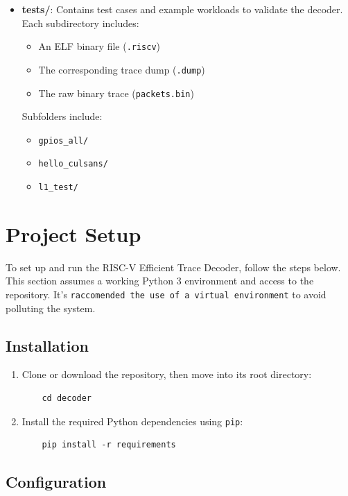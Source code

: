 \documentclass[a4paper,12pt]{article}
\begin{document}
\begin{itemize}
    \item \textbf{tests/}: Contains test cases and example workloads to validate the decoder. Each subdirectory includes:
    \begin{itemize}
        \item An ELF binary file (\texttt{.riscv})
        \item The corresponding trace dump (\texttt{.dump})
        \item The raw binary trace (\texttt{packets.bin})
    \end{itemize}
    Subfolders include:
    \begin{itemize}
        \item \texttt{gpios\_all/}
        \item \texttt{hello\_culsans/}
        \item \texttt{l1\_test/}
    \end{itemize}
\end{itemize}




\section{Project Setup}

To set up and run the RISC-V Efficient Trace Decoder, follow the steps below. This section assumes a working Python 3 environment and access to the repository. It's \texttt{raccomended the use of a virtual environment} to avoid polluting the system.

\subsection{Installation}

\begin{enumerate}
    \item Clone or download the repository, then move into its root directory:
    \begin{verbatim}
    cd decoder
    \end{verbatim}

    \item Install the required Python dependencies using \texttt{pip}:
    \begin{verbatim}
    pip install -r requirements
    \end{verbatim}
\end{enumerate}

\subsection{Configuration}
\end{document}
